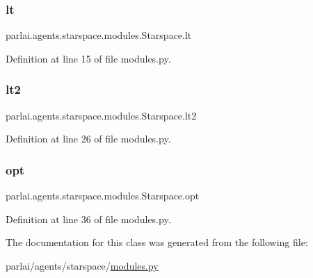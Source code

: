 \subsubsection{\texorpdfstring{lt}{lt}}
{\footnotesize\ttfamily parlai.\+agents.\+starspace.\+modules.\+Starspace.\+lt}



Definition at line 15 of file modules.\+py.

\mbox{\label{classparlai_1_1agents_1_1starspace_1_1modules_1_1Starspace_ae5bf28970ad7bd4207e8fe69986986fc}} 
\subsubsection{\texorpdfstring{lt2}{lt2}}
{\footnotesize\ttfamily parlai.\+agents.\+starspace.\+modules.\+Starspace.\+lt2}



Definition at line 26 of file modules.\+py.

\mbox{\label{classparlai_1_1agents_1_1starspace_1_1modules_1_1Starspace_af1f3c22c7248018379df0379d253f8db}} 
\subsubsection{\texorpdfstring{opt}{opt}}
{\footnotesize\ttfamily parlai.\+agents.\+starspace.\+modules.\+Starspace.\+opt}



Definition at line 36 of file modules.\+py.



The documentation for this class was generated from the following file\+:\begin{DoxyCompactItemize}
\item 
parlai/agents/starspace/\hyperlink{parlai_2agents_2starspace_2modules_8py}{modules.\+py}\end{DoxyCompactItemize}
